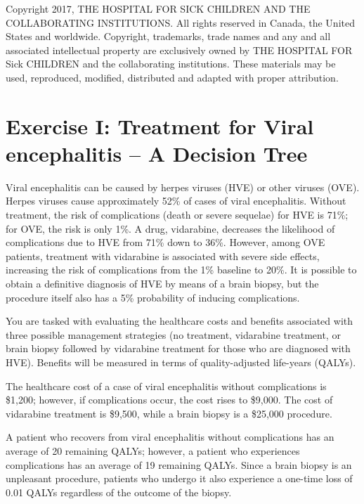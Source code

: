 \documentclass[
]{article}
\begin{document}
Copyright 2017, THE HOSPITAL FOR SICK CHILDREN AND THE COLLABORATING
INSTITUTIONS. All rights reserved in Canada, the United States and
worldwide. Copyright, trademarks, trade names and any and all associated
intellectual property are exclusively owned by THE HOSPITAL FOR Sick
CHILDREN and the collaborating institutions. These materials may be
used, reproduced, modified, distributed and adapted with proper
attribution.

\hypertarget{exercise-i-treatment-for-viral-encephalitis-a-decision-tree}{%
\section{Exercise I: Treatment for Viral encephalitis -- A Decision
Tree}\label{exercise-i-treatment-for-viral-encephalitis-a-decision-tree}}

Viral encephalitis can be caused by herpes viruses (HVE) or other
viruses (OVE). Herpes viruses cause approximately 52\% of cases of viral
encephalitis. Without treatment, the risk of complications (death or
severe sequelae) for HVE is 71\%; for OVE, the risk is only 1\%. A drug,
vidarabine, decreases the likelihood of complications due to HVE from
71\% down to 36\%. However, among OVE patients, treatment with
vidarabine is associated with severe side effects, increasing the risk
of complications from the 1\% baseline to 20\%. It is possible to obtain
a definitive diagnosis of HVE by means of a brain biopsy, but the
procedure itself also has a 5\% probability of inducing complications.

You are tasked with evaluating the healthcare costs and benefits
associated with three possible management strategies (no treatment,
vidarabine treatment, or brain biopsy followed by vidarabine treatment
for those who are diagnosed with HVE). Benefits will be measured in
terms of quality-adjusted life-years (QALYs).

The healthcare cost of a case of viral encephalitis without
complications is \$1,200; however, if complications occur, the cost
rises to \$9,000. The cost of vidarabine treatment is \$9,500, while a
brain biopsy is a \$25,000 procedure.

A patient who recovers from viral encephalitis without complications has
an average of 20 remaining QALYs; however, a patient who experiences
complications has an average of 19 remaining QALYs. Since a brain biopsy
is an unpleasant procedure, patients who undergo it also experience a
one-time loss of 0.01 QALYs regardless of the outcome of the biopsy.
\end{document}
